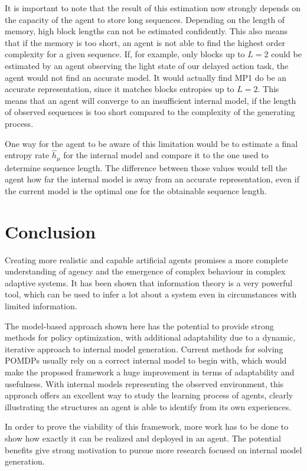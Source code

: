 \documentclass[12pt,a4paper]{article}
\begin{document}
It is important to note that the result of this estimation now strongly depends on the capacity of the agent to store long sequences.
Depending on the length of memory, high block lengths can not be estimated confidently.
This also means that if the memory is too short, an agent is not able to find the highest order complexity for a given sequence.
If, for example, only blocks up to $L=2$ could be estimated by an agent observing the light state of our delayed action task, the agent would not find an accurate model.
It would actually find MP1 do be an accurate representation, since it matches blocks entropies up to $L=2$.
This means that an agent will converge to an insufficient internal model, if the length of observed sequences is too short compared to the complexity of the generating process.

One way for the agent to be aware of this limitation would be to estimate a final entropy rate $\hat{h}_\mu$ for the internal model and compare it to the one used to determine sequence length.
The difference between those values would tell the agent how far the internal model is away from an accurate representation, even if the current model is the optimal one for the obtainable sequence length.

\newpage
\section{Conclusion} \label{sec:conclusion}
Creating more realistic and capable artificial agents promises a more complete understanding of agency and the emergence of complex behaviour in complex adaptive systems.
It has been shown that information theory is a very powerful tool, which can be used to infer a lot about a system even in circumstances with limited information.

The model-based approach shown here has the potential to provide strong methods for policy optimization, with additional adaptability due to a dynamic, iterative approach to internal model generation.
Current methods for solving POMDPs usually rely on a correct internal model to begin with, which would make the proposed framework a huge improvement in terms of adaptability and usefulness.
With internal models representing the observed environment, this approach offers an excellent way to study the learning process of agents, clearly illustrating the structures an agent is able to identify from its own experiences.

In order to prove the viability of this framework, more work has to be done to show how exactly it can be realized and deployed in an agent.
The potential benefits give strong motivation to pursue more research focused on internal model generation.
\end{document}

